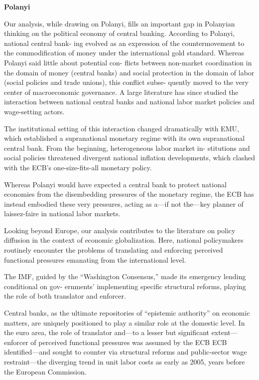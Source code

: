 \documentclass[
]{book}
\begin{document}
\textbf{Polanyi}

Our analysis, while drawing on Polanyi, fills an important gap in Polanyian thinking
on the political economy of central banking. According to Polanyi, national central bank-
ing evolved as an expression of the countermovement to the commodification of money
under the international gold standard. Whereas Polanyi said little about potential con-
flicts between non-market coordination in the domain of money (central banks) and social
protection in the domain of labor (social policies and trade unions), this conflict subse-
quently moved to the very center of macroeconomic governance.
A large literature has
since studied the interaction between national central banks and national labor market
policies and wage-setting actors.

The institutional setting of this interaction
changed dramatically with EMU, which established a supranational monetary regime with
its own supranational central bank. From the beginning, heterogeneous labor market in-
stitutions and social policies threatened divergent national inflation developments, which
clashed with the ECB's one-size-fits-all monetary policy.

Whereas Polanyi would have
expected a central bank to protect national economies from the disembedding pressures
of the monetary regime, the ECB has instead embodied these very pressures, acting as
a---if not the---key planner of laissez-faire in national labor markets.

Looking beyond Europe, our analysis contributes to the literature on policy diffusion in
the context of economic globalization.
Here, national policymakers routinely encounter
the problems of translating and enforcing perceived functional pressures emanating from
the international level.

The IMF,
guided by the ``Washington Consensus,'' made its emergency lending conditional on gov-
ernments' implementing specific structural reforms, playing the role of both translator
and enforcer.

Central banks, as the ultimate repositories of ``epistemic authority'' on
economic matters, are uniquely positioned to play a similar role at the domestic level.
In the euro area, the role of translator and---to a lesser but significant
extent---enforcer of perceived functional pressures was assumed by the ECB
ECB identified---and sought to counter via structural reforms
and public-sector wage restraint---the diverging trend in unit labor costs
as early as 2005, years before the European Commission.
\end{document}
